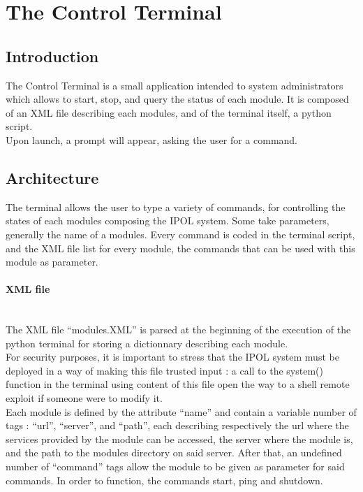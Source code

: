 \section{The Control Terminal}

\subsection{Introduction}
The Control Terminal is a small application intended to system administrators which allows to start, stop, and query the status of each module. It is composed of an XML file describing each modules, and of the terminal itself, a python script. \\
Upon launch, a prompt will appear, asking the user for a command.

\subsection{Architecture}
The terminal allows the user to type a variety of commands, for controlling the states of each modules composing the IPOL system. Some take parameters, generally the name of a modules. Every command is coded in the terminal script, and the XML file list for every module, the commands that can be used with this module as parameter.

\paragraph{XML file} \hspace{0pt} \\
The XML file ``modules.XML'' is parsed at the beginning of the execution of the python terminal for storing a dictionnary describing each module. \\
For security purposes, it is important to stress that the IPOL system must be deployed in a way of making this file trusted input : a call to the system() function in the terminal using content of this file open the way to a shell remote exploit if someone were to modify it. \\
Each module is defined by the attribute ``name'' and contain a variable number of tags : ``url'', ``server'', and ``path'', each describing respectively the url where the services provided by the module can be accessed, the server where the module is, and the path to the modules directory on said server. After that, an undefined number of ``command'' tags allow the module to be given as parameter for said commands. In order to function, the commands start, ping and shutdown.


